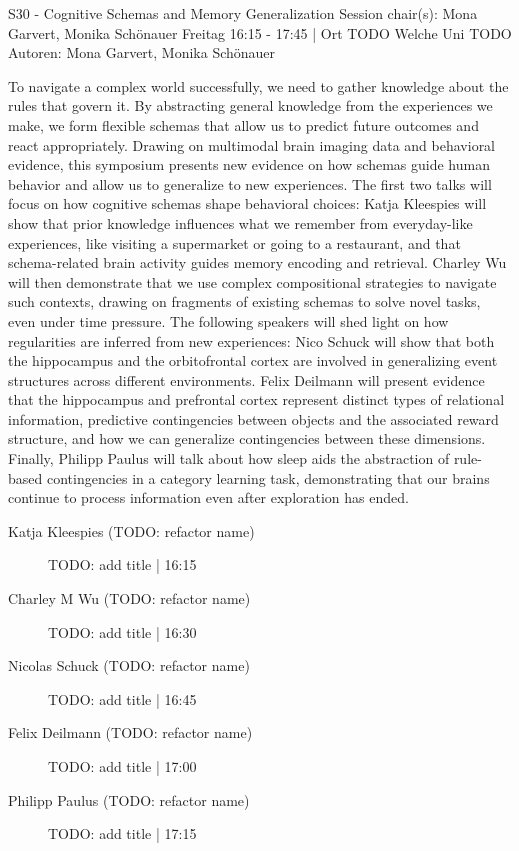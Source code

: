 
            \begin{symposium}
            {S30 - Cognitive Schemas and Memory Generalization}
            {Session chair(s): Mona Garvert, Monika Schönauer}
            {Freitag 16:15 - 17:45 | Ort TODO}
            {Welche Uni TODO}
            Autoren: Mona Garvert, Monika Schönauer

To navigate a complex world successfully, we need to gather knowledge about the rules that govern it. By abstracting general knowledge from the experiences we make, we form flexible schemas that allow us to predict future outcomes and react appropriately. Drawing on multimodal brain imaging data and behavioral evidence, this symposium presents new evidence on how schemas guide human behavior and allow us to generalize to new experiences. The first two talks will focus on how cognitive schemas shape behavioral choices: Katja Kleespies will show that prior knowledge influences what we remember from everyday-like experiences, like visiting a supermarket or going to a restaurant, and that schema-related brain activity guides memory encoding and retrieval. Charley Wu will then demonstrate that we use complex compositional strategies to navigate such contexts, drawing on fragments of existing schemas to solve novel tasks, even under time pressure. The following speakers will shed light on how regularities are inferred from new experiences: Nico Schuck will show that both the hippocampus and the orbitofrontal cortex are involved in generalizing event structures across different environments. Felix Deilmann will present evidence that the hippocampus and prefrontal cortex represent distinct types of relational information, predictive contingencies between objects and the associated reward structure, and how we can generalize contingencies between these dimensions. Finally, Philipp Paulus will talk about how sleep aids the abstraction of rule-based contingencies in a category learning task, demonstrating that our brains continue to process information even after exploration has ended.
            \begin{description}    
            
                \item [Katja Kleespies (TODO: refactor name)] TODO: add title \textcolor{mygray}{ | 16:15}    
                
                \item [Charley M Wu (TODO: refactor name)] TODO: add title \textcolor{mygray}{ | 16:30}    
                
                \item [Nicolas Schuck  (TODO: refactor name)] TODO: add title \textcolor{mygray}{ | 16:45}    
                
                \item [Felix Deilmann  (TODO: refactor name)] TODO: add title \textcolor{mygray}{ | 17:00}    
                
                \item [Philipp Paulus (TODO: refactor name)] TODO: add title \textcolor{mygray}{ | 17:15}    
                
            \end{description} 
            \end{symposium}
            